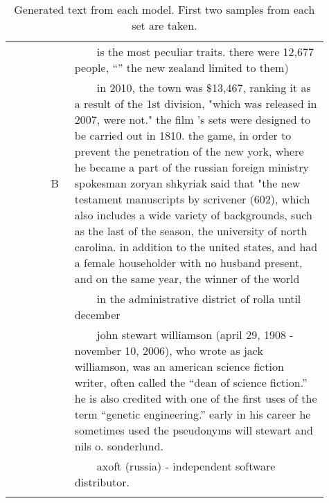 \documentclass[11pt,a4paper]{article}
\newcommand{\tabitem}{~~\llap{\textbullet}~~}
\begin{document}
\begin{longtable}{ >{\footnotesize}p{0.11\linewidth}c>{\small}p{0.8\linewidth} }
& & \tabitem is the most peculiar traits. there were 12,677 people, ``'' the new zealand limited to them)\\ \cline{2-3}
 &B& \tabitem in 2010, the town was \$13,467, ranking it as a result of the 1st division, "which was released in 2007, were not." the film 's sets were designed to be carried out in 1810. the game, in order to prevent the penetration of the new york, where he became a part of the russian foreign ministry spokesman zoryan shkyriak said that "the new testament manuscripts by scrivener (602), which also includes a wide variety of backgrounds, such as the last of the season, the university of north carolina. in addition to the united states, and had a female householder with no husband present, and on the same year, the winner of the world \\
& & \tabitem in the administrative district of rolla until december \\ 
 \toprule
  \multirow{2}{*}{\bf Test Set} & & \tabitem john stewart williamson (april 29, 1908 - november 10, 2006), who wrote as jack williamson, was an american science fiction writer, often called the ``dean of science fiction.'' he is also credited with one of the first uses of the term ``genetic engineering.'' early in his career he sometimes used the pseudonyms will stewart and nils o. sonderlund.\\
 & & \tabitem axoft (russia) - independent software distributor.\\
\toprule
\caption{Generated text from each model. First two samples from each set are taken.}\label{tab:gen} 
\end{longtable}


\end{document}
